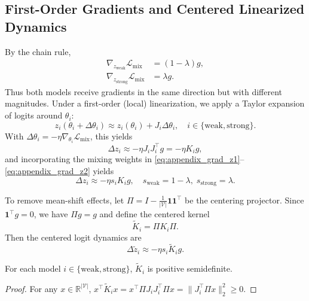 \subsection{First-Order Gradients and Centered Linearized Dynamics}
By the chain rule,
\begin{align}
    \nabla_{z_{\mathrm{weak}}} \mathcal{L}_{\mathrm{mix}} &= (1-\lambda) g, \label{eq:appendix_grad_z1} \\
    \nabla_{z_{\mathrm{strong}}} \mathcal{L}_{\mathrm{mix}} &= \lambda g. \label{eq:appendix_grad_z2}
\end{align}
Thus both models receive gradients in the same direction but with different magnitudes. Under a first-order (local) linearization, we apply a Taylor expansion of logits around $\theta_i$:
\begin{equation}
    z_i(\theta_i + \Delta \theta_i) \approx z_i(\theta_i) + J_i \Delta \theta_i, \quad i \in \{\mathrm{weak}, \mathrm{strong}\}.
    \label{eq:appendix_taylor_logits}
\end{equation}
With $\Delta \theta_i = -\eta \nabla_{\theta_i}\mathcal{L}_{\mathrm{mix}}$, this yields
\begin{equation}
    \Delta z_i \approx -\eta J_i J_i^\top g = -\eta K_i g,
    \label{eq:appendix_update_z_i}
\end{equation}
and incorporating the mixing weights in \eqref{eq:appendix_grad_z1}--\eqref{eq:appendix_grad_z2} yields
\begin{equation}
    \Delta z_i \approx -\eta s_i K_i g, \quad s_{\mathrm{weak}} = 1-\lambda,\; s_{\mathrm{strong}} = \lambda.
    \label{eq:appendix_update_weighted}
\end{equation}

To remove mean-shift effects, let $\Pi = I - \frac{1}{|\mathcal{V}|}\mathbf{1}\mathbf{1}^\top$ be the centering projector. Since $\mathbf{1}^\top g = 0$, we have $\Pi g = g$ and define the centered kernel
\begin{equation}
    \tilde{K}_i = \Pi K_i \Pi.
    \label{eq:appendix_centered_kernel}
\end{equation}
Then the centered logit dynamics are
\begin{equation}
    \Delta \tilde{z}_i \approx -\eta s_i \tilde{K}_i g.
    \label{eq:appendix_update_centered}
\end{equation}

\begin{lemma}
For each model $i \in \{\mathrm{weak}, \mathrm{strong}\}$, $\tilde{K}_i$ is positive semidefinite.
\end{lemma}
\begin{proof}
For any $x \in \mathbb{R}^{|\mathcal{V}|}$, $x^\top \tilde{K}_i x = x^\top \Pi J_i J_i^\top \Pi x = \|J_i^\top \Pi x\|_2^2 \ge 0$.
\end{proof}

